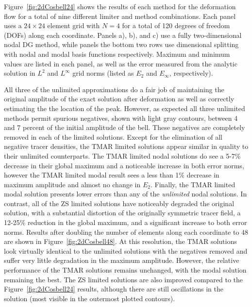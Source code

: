 \documentclass{ametsoc}
\begin{document}
Figure~\ref{fig:2dCosbell24} shows the results of each method for the deformation flow for a total of nine different limiter and method combinations. Each panel uses a $24 \times 24$ element grid with $N=4$ for a total of 120 degrees of freedom (DOFs) along each coordinate. Panels a), b), and c) use a fully two-dimensional nodal DG method, while panels the bottom two rows use dimensional splitting with nodal and modal basis functions respectively. Maximum and minimum values are listed in each panel, as well as the error measured from the analytic solution in $L^2$ and $L^{\infty}$ grid norms (listed as $E_2$ and $E_{\infty}$, respectively).

All three of the unlimited approximations do a fair job of maintaining the original amplitude of the exact solution after deformation as well as correctly estimating the the location of the peak. However, as expected all three unlimited methods permit spurious negatives, shown with light gray contours, between 4 and 7 percent of the initial amplitude of the bell. These negatives are completely removed in each of the limited solutions. Except for the elimination of all negative tracer densities, the TMAR limited solutions appear similar in quality to their unlimited counterparts. The TMAR limited nodal solutions do see a 5-7\% decrease in their global maximum and a noticeable increase in both error norms, however the TMAR limited modal result sees a less than 1\% decrease in maximum amplitude and almost no change in $E_2$. Finally, the TMAR limited modal solution presents lower errors than any of the {\it unlimited} nodal solutions. In contrast, all of the ZS limited solutions have noticeably degraded the original solution, with a substantial distortion of the originally symmetric tracer field, a 12-25\% reduction in the global maximum, and a significant increase to both error norms. Results after doubling the number of elements along each coordinate to 48 are shown in Figure~\ref{fig:2dCosbell48}. At this resolution, the TMAR solutions look virtually identical to the unlimited solutions with the negatives removed and suffer very little degradation in the maximum amplitude. However, the relative performance of the TMAR solutions remains unchanged, with the modal solution remaining the best. The ZS limited solutions are also improved compared to the Figure~\ref{fig:2dCosbell24} results, although there are still oscillations in the solution (most visible in the outermost plotted contours).
\end{document}
